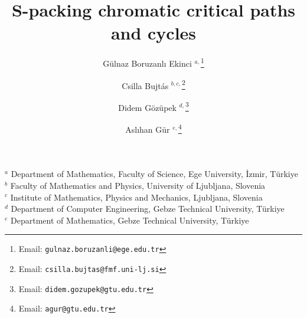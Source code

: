 \documentclass[12pt]{article}
\begin{document}
\title{S-packing chromatic critical paths and cycles}

\author{
\and G\"{u}lnaz Boruzanl{\i} Ekinci $^{a,}$\thanks{Email: \texttt{gulnaz.boruzanli@ege.edu.tr}} \\
     \and Csilla Bujt\'{a}s $^{b,c,}$\thanks{Email: \texttt{csilla.bujtas@fmf.uni-lj.si}}
      \and Didem G\"{o}z\"{u}pek $^{d,}$\thanks{Email: \texttt{didem.gozupek@gtu.edu.tr}}
      \and Asl{\i}han G\"{u}r $^{e,}$\thanks{Email: \texttt{agur@gtu.edu.tr}}
	}
\maketitle

\begin{center}
$^a$ Department of Mathematics, Faculty of Science, Ege University, İzmir, T\"{u}rkiye\\
	\medskip
	$^b$ Faculty of Mathematics and Physics, University of Ljubljana, Slovenia\\
	\medskip
	$^c$ Institute of Mathematics, Physics and Mechanics, Ljubljana, Slovenia\\
	\medskip
    $^d$ Department of Computer Engineering, Gebze Technical University, T\"{u}rkiye \\
	\medskip
    $^e$ Department of Mathematics, Gebze Technical University, T\"{u}rkiye \\
	\medskip
 \end{center}
\end{document}
